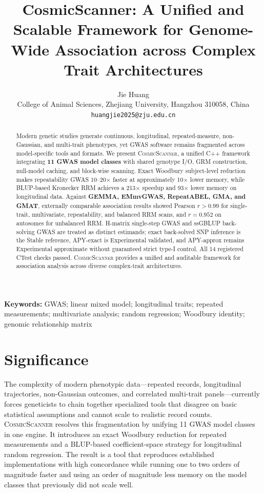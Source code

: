 \documentclass[11pt,a4paper]{article}
\title{\bfseries\LARGE CosmicScanner: A Unified and Scalable Framework for Genome-Wide Association across Complex Trait Architectures}
\author{Jie Huang\\
  \small College of Animal Sciences, Zhejiang University, Hangzhou 310058, China\\
  \small \texttt{huangjie2025@zju.edu.cn}
}
\date{}
\newcommand{\CosmicScanner}{\textsc{CosmicScanner}}
\begin{document}
\maketitle

\begin{abstract}
Modern genetic studies generate continuous, longitudinal, repeated-measure, non-Gaussian, and multi-trait phenotypes, yet GWAS software remains fragmented across model-specific tools and formats. We present \CosmicScanner, a unified C++ framework integrating \textbf{11 GWAS model classes} with shared genotype I/O, GRM construction, null-model caching, and block-wise scanning. Exact Woodbury subject-level reduction makes repeatability GWAS 10--20$\times$ faster at approximately 10$\times$ lower memory, while BLUP-based Kronecker RRM achieves a 213$\times$ speedup and 93$\times$ lower memory on longitudinal data. Against \textbf{GEMMA, EMmvGWAS, RepeatABEL, GMA, and GMAT}, externally comparable association results showed Pearson $r > 0.99$ for single-trait, multivariate, repeatability, and balanced RRM scans, and $r=0.952$ on autosomes for unbalanced RRM. H-matrix single-step GWAS and ssGBLUP back-solving GWAS are treated as distinct estimands; exact back-solved SNP inference is the Stable reference, APY-exact is Experimental validated, and APY-approx remains Experimental approximate without guaranteed strict type-I control. All 14 registered CTest checks passed. \CosmicScanner{} provides a unified and auditable framework for association analysis across diverse complex-trait architectures.
\end{abstract}

\noindent\textbf{Keywords:} GWAS; linear mixed model; longitudinal traits; repeated measurements; multivariate analysis; random regression; Woodbury identity; genomic relationship matrix

\section*{Significance}
\label{sec:significance}

The complexity of modern phenotypic data---repeated records, longitudinal trajectories, non-Gaussian outcomes, and correlated multi-trait panels---currently forces geneticists to chain together specialized tools that disagree on basic statistical assumptions and cannot scale to realistic record counts. \CosmicScanner{} resolves this fragmentation by unifying 11 GWAS model classes in one engine. It introduces an exact Woodbury reduction for repeated measurements and a BLUP-based coefficient-space strategy for longitudinal random regression. The result is a tool that reproduces established implementations with high concordance while running one to two orders of magnitude faster and using an order of magnitude less memory on the model classes that previously did not scale well.
\end{document}
